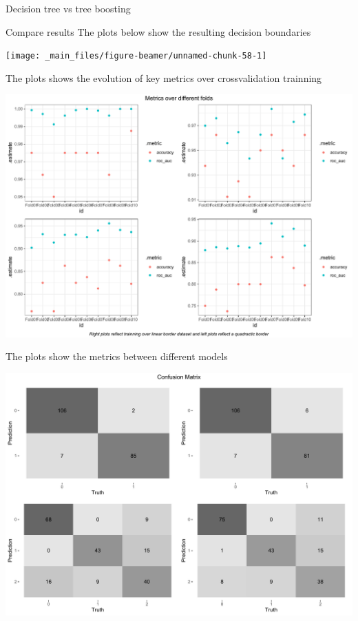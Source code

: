 \documentclass[
  ignorenonframetext,
]{article}
\begin{document}
\begin{frame}[fragile]{Decision tree vs tree boosting}
\begin{block}{Compare results}
\protect\hypertarget{compare-results-3}{}
The plots below show the resulting decision boundaries

\begin{center}\texttt{[image: \_main\_files/figure-beamer/unnamed-chunk-58-1]} \end{center}

The plots shows the evolution of key metrics over crossvalidation trainning

\begin{center}\includegraphics{_main_files/figure-beamer/unnamed-chunk-59-1} \end{center}

The plots show the metrics between different models

\begin{center}\includegraphics{_main_files/figure-beamer/unnamed-chunk-60-1} \end{center}


\end{block}
\end{frame}
\end{document}
